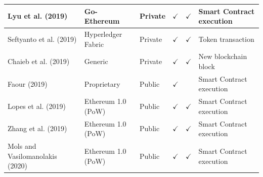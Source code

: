 \documentclass[../access.tex]{subfiles}
\begin{document}
\begin{table}[htbp]
\begin{adjustwidth}{-1cm}{}
\begin{tabular}{m{4.4cm} >{\centering\arraybackslash}m{2.9cm} >{\centering\arraybackslash}m{1.0cm} >{\centering\arraybackslash}m{1.0cm} >{\centering\arraybackslash}m{1.5cm} >{\centering\arraybackslash}m{3.6cm}}
            \hline
            \footnotesize{Lyu et al. (2019) \cite{Lyu2019}}                & \footnotesize{Go-Ethereum}                     & \footnotesize{Private}                           & $ \checkmark $                                         & $ \checkmark $                                        & \footnotesize{Smart Contract execution}    \\
            \hline
            \footnotesize{Seftyanto et al. (2019) \cite{Seftyanto2019}}    & \footnotesize{Hyperledger Fabric}              & \footnotesize{Private}                           & $ \checkmark $                                         & $ \checkmark $                                        & \footnotesize{Token transaction}           \\
            \hline
            \footnotesize{Chaieb et al. (2019) \cite{Chaieb2019}}          & \footnotesize{Generic}                         & \footnotesize{Private}                           & $ \checkmark $                                         & $ \checkmark $                                        & \footnotesize{New blockchain block}        \\
            \hline
            \footnotesize{Faour (2019) \cite{Faour2019}}                   & \footnotesize{Proprietary}                     & \footnotesize{Public}                            & $ \checkmark $                                         & {}                                                    & \footnotesize{Smart Contract execution}    \\
            \hline
            \footnotesize{Lopes et al. (2019) \cite{Lopes2019}}            & \footnotesize{Ethereum 1.0 (PoW)}              & \footnotesize{Public}                            & $ \checkmark $                                         & $ \checkmark $                                        & \footnotesize{Smart Contract execution}    \\
            \hline
            \footnotesize{Zhang et al. (2019) \cite{Zhang2019a}}           & \footnotesize{Ethereum 1.0 (PoW)}              & \footnotesize{Public}                            & $ \checkmark $                                         & $ \checkmark $                                        & \footnotesize{Smart Contract execution}    \\
            \hline
            \footnotesize{Mols and Vasilomanolakis (2020) \cite{Mols2020}} & \footnotesize{Ethereum 1.0 (PoW)}              & \footnotesize{Public}                            & $ \checkmark $                                         & $ \checkmark $                                        & \footnotesize{Smart Contract execution}    \\

\end{tabular}
\end{adjustwidth}
\end{table}
\end{document}
